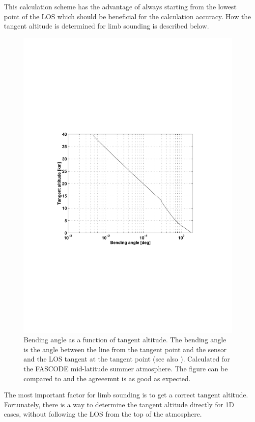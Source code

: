   This calculation scheme has the advantage of always starting from the 
  lowest point of the LOS which should be beneficial for the calculation
  accuracy. How the tangent altitude is determined for limb sounding is 
  described below. 
  

    
   \begin{figure}
    \begin{center}
      \includegraphics*[width=0.8\hsize]{Figs/fig_bendingangle}
      \caption{Bending angle as a function of tangent altitude. The bending
        angle is the angle between the line from the tangent point and
        the sensor and the LOS tangent at the tangent point (see also
        \citet[][Figure 1]{kursinski:97}). Calculated for the FASCODE
        mid-latitude summer atmosphere. The figure can be compared to
        \citet[][Figure 3]{kursinski:97} and the agreeemnt is as good as
        expected.}
      \label{fig:los:bendingangle} 
    \end{center} 
  \end{figure}

  The most important factor for limb sounding is to get a correct
  tangent altitude. Fortunately, there is a way to determine the
  tangent altitude directly for 1D cases, without following the LOS
  from the top of the atmosphere.

